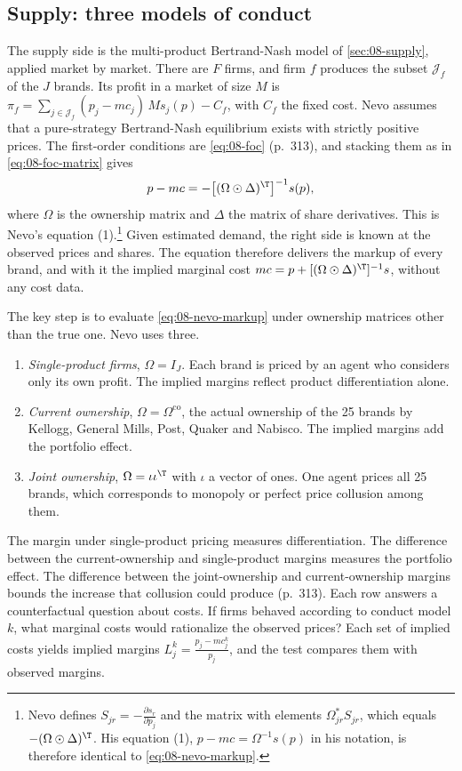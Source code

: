 \subsection{Supply: three models of conduct}\label{sec:08-nevo01-supply}

The supply side is the multi-product Bertrand-Nash model of \cref{sec:08-supply}, applied market by market.
There are $F$ firms, and firm $f$ produces the subset $\mathcal{J}_f$ of the $J$ brands. Its profit in a market of
size $M$ is $\pi_f = \sum_{j \in \mathcal{J}_f} (p_j - mc_j)\, M s_j(p) - C_f$, with $C_f$ the fixed cost. Nevo
assumes that a pure-strategy Bertrand-Nash equilibrium exists with strictly positive prices. The first-order
conditions are \eqref{eq:08-foc} (p.~313), and stacking them as in \eqref{eq:08-foc-matrix} gives
\begin{equation}\label{eq:08-nevo-markup}
p - mc = -\big[(\Omega \odot \Delta)^{\T}\big]^{-1} s(p),
\end{equation}
where $\Omega$ is the ownership matrix and $\Delta$ the matrix of share derivatives. This is Nevo's equation
(1).\footnote{Nevo defines $S_{jr} = -\frac{\partial s_r}{\partial p_j}$ and the
matrix with elements $\Omega^*_{jr} S_{jr}$, which equals $-(\Omega\odot\Delta)^{\T}$. His equation (1), $p -
mc = \Omega^{-1}s(p)$ in his notation, is therefore identical to \cref{eq:08-nevo-markup}.} Given estimated
demand, the right side is known at the observed prices and shares. The equation therefore delivers the markup
of every brand, and with it the implied marginal cost $mc = p + [(\Omega\odot\Delta)^{\T}]^{-1}s$, without any
cost data.

The key step is to evaluate \cref{eq:08-nevo-markup} under ownership matrices other than the true one. Nevo
uses three.
\begin{enumerate}
\item \emph{Single-product firms}, $\Omega = I_J$. Each brand is priced by an agent who considers only its own
profit. The implied margins reflect product differentiation alone.
\item \emph{Current ownership}, $\Omega = \Omega^{\mathrm{co}}$, the actual ownership of the 25 brands by
Kellogg, General Mills, Post, Quaker and Nabisco. The implied margins add the portfolio effect.
\item \emph{Joint ownership}, $\Omega = \iota\iota^{\T}$ with $\iota$ a vector of ones. One agent prices all
25 brands, which corresponds to monopoly or perfect price collusion among them.
\end{enumerate}
The margin under single-product pricing measures differentiation. The difference between the current-ownership
and single-product margins measures the portfolio effect. The difference between the joint-ownership and
current-ownership margins bounds the increase that collusion could produce (p.~313). Each row answers a
counterfactual question about costs. If firms behaved according to conduct model $k$, what marginal costs would
rationalize the observed prices? Each set of implied costs yields implied margins
$L_j^{k} = \frac{p_j - mc_j^{k}}{p_j}$, and the test compares them with observed margins.

